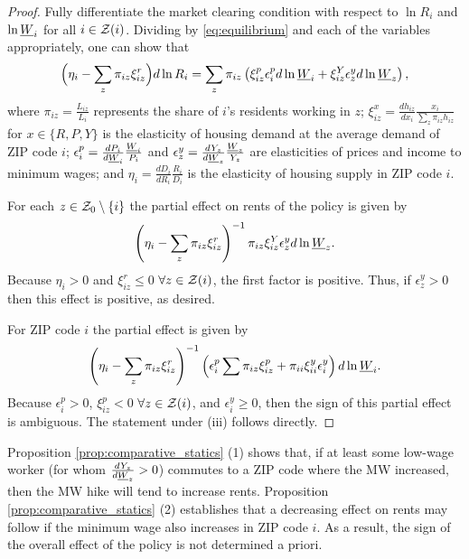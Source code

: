\begin{proof}
    Fully differentiate the market clearing condition with respect to $\ln R_i$ 
    and $\ln \underline{W}_i$ for all $i\in\mathcal{Z}(i)$.
    Dividing by \ref{eq:equilibrium} and each of the variables appropriately, 
    one can show that
    \begin{equation}\label{eq:diff_equilibrium}
        \Big(\eta_i - \sum_z \pi_{iz} \xi^r_{iz} \Big) d \ln R_i
        = 
        \sum_z \pi_{iz} \left(\xi^p_{iz} \epsilon_{i}^p d \ln \underline{W}_i 
                            + \xi^Y_{iz} \epsilon_{z}^y d \ln \underline{W}_z \right) ,
    \end{equation}
    where
    $\pi_{iz} = \frac{L_{iz}}{L_i}$ represents the share of $i$'s residents 
    working in $z$;
    $\xi_{iz}^x = \frac{d h_{iz}}{d x_i} \frac{x_i}{\sum_z \pi_{iz} h_{iz}}$ for
    $x\in\{R,P,Y\}$ is the elasticity of housing demand at the average demand of
    ZIP code $i$;
    $\epsilon_{i}^p = \frac{d P_i}{d \underline{W}_i} \frac{\underline{W}_i}{P_i}$ and 
    $\epsilon_{z}^y = \frac{d Y_z}{d \underline{W}_z} \frac{\underline{W}_z}{Y_z}$ are
    elasticities of prices and income to minimum wages; and
    $\eta_i = \frac{d D_i}{d R_i} \frac{R_i}{D_i}$ is the elasticity 
    of housing supply in ZIP code $i$.

    For each $z\in\mathcal{Z}_0\setminus\{i\}$ the partial effect on rents of the policy
    is given by 
    $$\left(\eta_i - \sum_z \pi_{iz} \xi^r_{iz}\right)^{-1} 
      \pi_{iz}\xi^Y_{iz}\epsilon_{z}^y d\ln\underline{W}_z.$$
    Because $\eta_i>0$ and $\xi^r_{iz}\leq 0$  $\forall z\in\mathcal{Z}(i)$, the first 
    factor is positive.
    Thus, if $\epsilon_{z}^y>0$ then this effect is positive, as desired.

    For ZIP code $i$ the partial effect is given by
    $$\left(\eta_i - \sum_z \pi_{iz} \xi^r_{iz}\right)^{-1} 
      \left(\epsilon_{i}^p \sum \pi_{iz}\xi^p_{iz} 
            + \pi_{ii}\xi^y_{ii}\epsilon_i^y \right)d\ln\underline{W}_i.$$
    Because $\epsilon_{i}^p>0$, $\xi^p_{iz}<0$ $\forall z\in\mathcal{Z}(i)$,
    and $\epsilon_{i}^y\geq0$, 
    then the sign of this partial effect is ambiguous.
    The statement under (iii) follows directly.
\end{proof}

Proposition \ref{prop:comparative_statics} (1) shows that, 
if at least some low-wage worker (for whom $\frac{d Y_z}{d \underline{W}_z}>0$) 
commutes to a ZIP code where the MW increased, 
then the MW hike will tend to increase rents.
Proposition \ref{prop:comparative_statics} (2) establishes that a decreasing
effect on rents may follow if the minimum wage also increases in ZIP code $i$.
As a result, the sign of the overall effect of the policy is not determined a 
priori.


